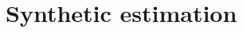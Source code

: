 \documentclass{article}
\newtheorem{assumption}{Assumption}
\begin{document}






\section{Synthetic estimation}
\end{document}

